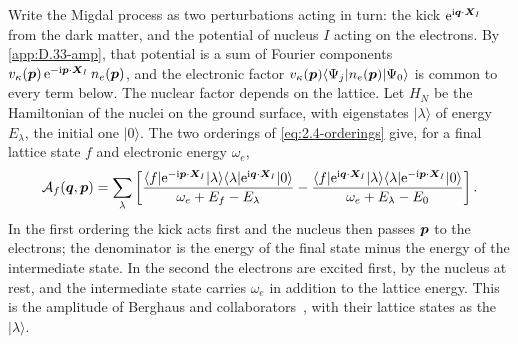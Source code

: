 Write the Migdal process as two perturbations acting in turn: the kick $\mathrm{e}^{\mathrm{i}\bm{q}\cdot\bm{X}_I}$ from the dark matter, and the potential of nucleus $I$ acting on the electrons. By \cref{app:D.33-amp}, that potential is a sum of Fourier components $v_\kappa(\bm{p})\,\mathrm{e}^{-\mathrm{i}\bm{p}\cdot\bm{X}_I}\,n_e(\bm{p})$, and the electronic factor $v_\kappa(\bm{p})\langle\Psi_j|n_e(\bm{p})|\Psi_0\rangle$ is common to every term below. The nuclear factor depends on the lattice. Let $H_N$ be the Hamiltonian of the nuclei on the ground surface, with eigenstates $|\lambda\rangle$ of energy $E_\lambda$, the initial one $|0\rangle$. The two orderings of \cref{eq:2.4-orderings} give, for a final lattice state $f$ and electronic energy $\omega_e$,
\begin{equation}
  \mathcal{A}_f(\bm{q},\bm{p}) = \sum_\lambda\left[\frac{\langle f|\mathrm{e}^{-\mathrm{i}\bm{p}\cdot\bm{X}_I}|\lambda\rangle\langle\lambda|\mathrm{e}^{\mathrm{i}\bm{q}\cdot\bm{X}_I}|0\rangle}{\omega_e + E_f - E_\lambda}
  - \frac{\langle f|\mathrm{e}^{\mathrm{i}\bm{q}\cdot\bm{X}_I}|\lambda\rangle\langle\lambda|\mathrm{e}^{-\mathrm{i}\bm{p}\cdot\bm{X}_I}|0\rangle}{\omega_e + E_\lambda - E_0}\right] .
  \label{eq:12.4-exact}
\end{equation}
In the first ordering the kick acts first and the nucleus then passes $\bm{p}$ to the electrons; the denominator is the energy of the final state minus the energy of the intermediate state. In the second the electrons are excited first, by the nucleus at rest, and the intermediate state carries $\omega_e$ in addition to the lattice energy. This is the amplitude of Berghaus and collaborators~\cite[Eq.~(3.1)]{berghaus2023migdal}, with their lattice states as the $|\lambda\rangle$.

